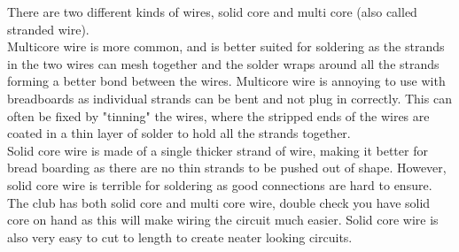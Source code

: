 \documentclass[a4paper,12pt]{article}
\begin{document}
\begin{notebox}
    There are two different kinds of wires, solid core and multi core (also called stranded wire). \\

    
    Multicore wire is more common, and is better suited for soldering as the strands in the two wires can mesh together and the solder wraps around all the strands forming a better bond between the wires. Multicore wire is annoying to use with breadboards as individual strands can be bent and not plug in correctly. This can often be fixed by "tinning" the wires, where the stripped ends of the wires are coated in a thin layer of solder to hold all the strands together.\\

    Solid core wire is made of a single thicker strand of wire, making it better for bread boarding as there are no thin strands to be pushed out of shape. However, solid core wire is terrible for soldering as good connections are hard to ensure. \\



    The club has both solid core and multi core wire, double check you have solid core on hand as this will make wiring the circuit much easier. Solid core wire is also very easy to cut to length to create neater looking circuits. \\
    
\end{notebox}

\bigskip


\pagebreak


\pagebreak


\pagebreak


\pagebreak


% 
\end{document}

